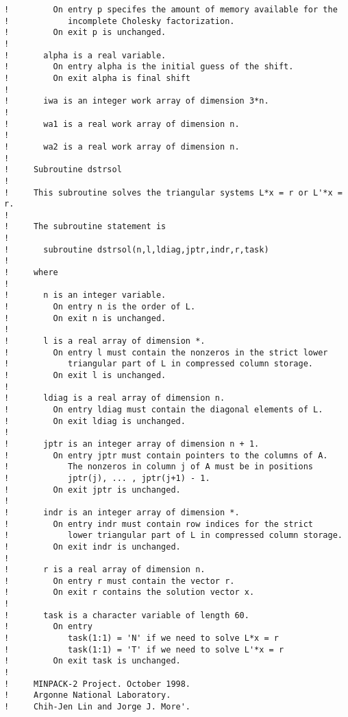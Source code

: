 \documentclass{galahad}
\begin{document}
\begin{verbatim}
!         On entry p specifes the amount of memory available for the
!            incomplete Cholesky factorization.
!         On exit p is unchanged.
!
!       alpha is a real variable.
!         On entry alpha is the initial guess of the shift.
!         On exit alpha is final shift
!
!       iwa is an integer work array of dimension 3*n.
!
!       wa1 is a real work array of dimension n.
!
!       wa2 is a real work array of dimension n.
!
!     Subroutine dstrsol
!
!     This subroutine solves the triangular systems L*x = r or L'*x = r.
!
!     The subroutine statement is
!
!       subroutine dstrsol(n,l,ldiag,jptr,indr,r,task)
!
!     where
!
!       n is an integer variable.
!         On entry n is the order of L.
!         On exit n is unchanged.
!
!       l is a real array of dimension *.
!         On entry l must contain the nonzeros in the strict lower
!            triangular part of L in compressed column storage.
!         On exit l is unchanged.
!
!       ldiag is a real array of dimension n.
!         On entry ldiag must contain the diagonal elements of L.
!         On exit ldiag is unchanged.
!
!       jptr is an integer array of dimension n + 1.
!         On entry jptr must contain pointers to the columns of A.
!            The nonzeros in column j of A must be in positions
!            jptr(j), ... , jptr(j+1) - 1.
!         On exit jptr is unchanged.
!
!       indr is an integer array of dimension *.
!         On entry indr must contain row indices for the strict
!            lower triangular part of L in compressed column storage.
!         On exit indr is unchanged.
!
!       r is a real array of dimension n.
!         On entry r must contain the vector r.
!         On exit r contains the solution vector x.
!
!       task is a character variable of length 60.
!         On entry
!            task(1:1) = 'N' if we need to solve L*x = r
!            task(1:1) = 'T' if we need to solve L'*x = r
!         On exit task is unchanged.
!
!     MINPACK-2 Project. October 1998.
!     Argonne National Laboratory.
!     Chih-Jen Lin and Jorge J. More'.
\end{verbatim}
\end{document}

